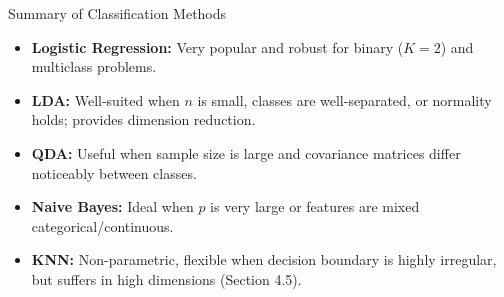 \documentclass[aspectratio=169, 11pt]{beamer}
\begin{document}
\begin{frame}{Summary of Classification Methods}
  \begin{itemize}
    \item \textbf{Logistic Regression:} Very popular and robust for binary ($K = 2$) and multiclass problems.
    \item \textbf{LDA:} Well-suited when $n$ is small, classes are well-separated, or normality holds; provides dimension reduction.
    \item \textbf{QDA:} Useful when sample size is large and covariance matrices differ noticeably between classes.
    \item \textbf{Naive Bayes:} Ideal when $p$ is very large or features are mixed categorical/continuous.
    \item \textbf{KNN:} Non-parametric, flexible when decision boundary is highly irregular, but suffers in high dimensions (Section 4.5).
  \end{itemize}
\end{frame}
\end{document}
